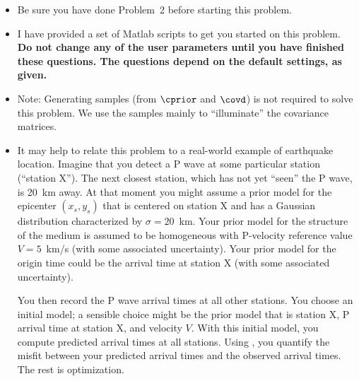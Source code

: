 \documentclass[11pt,titlepage,fleqn]{article}
\begin{document}
\begin{itemize}
\item Be sure you have done Problem~2 before starting this problem.

\item I have provided a set of Matlab scripts to get you started on this problem. {\bf Do not change any of the user parameters until you have finished these questions. The questions depend on the default settings, as given.}

\item Note: Generating samples (from $\cprior$ and $\covd$) is not required to solve this problem. We use the samples mainly to ``illuminate'' the covariance matrices.

\item It may help to relate this problem to a real-world example of earthquake location. Imagine that you detect a P wave at some particular station (``station X''). The next closest station, which has not yet ``seen'' the P wave, is 20~km away. At that moment you might assume a prior model for the epicenter $(x_s, y_s)$ that is centered on station X and has a Gaussian distribution characterized by $\sigma = 20$~km. 
Your prior model for the structure of the medium is assumed to be homogeneous with P-velocity reference value $V = 5$~km/s (with some associated uncertainty). Your prior model for the origin time could be the arrival time at station X (with some associated uncertainty).

You then record the P wave arrival times at all other stations. You choose an initial model; a sensible choice might be the prior model that is station X, P arrival time at station X, and velocity $V$. With this initial model, you compute predicted arrival times at all stations. Using , you quantify the misfit between your predicted arrival times and the observed arrival times. The rest is optimization.

\end{itemize}

\end{document}
